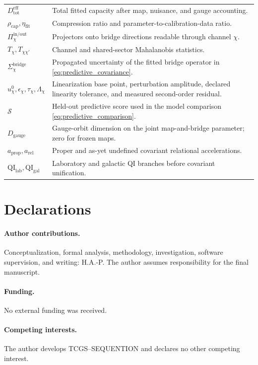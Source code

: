 \documentclass[11pt]{article}
\begin{document}
\begin{tabularx}{\textwidth}{>{\raggedright\arraybackslash}p{}X}
\(D_{\mathrm{tot}}^{\mathrm{eff}}\) & Total fitted capacity after map, nuisance, and gauge accounting. \\
\(\rho_{\mathrm{cap}},\eta_{\mathrm{fit}}\) & Compression ratio and parameter-to-calibration-data ratio. \\
\(\Pi_{\chi}^{\mathrm{in/out}}\) & Projectors onto bridge directions readable through channel \(\chi\). \\
\(T_{\chi},T_{\chi\chi'}\) & Channel and shared-sector Mahalanobis statistics. \\
\(\Sigma_{\chi}^{\mathrm{bridge}}\) & Propagated uncertainty of the fitted bridge operator in \cref{eq:predictive_covariance}. \\
\(u_{\chi}^{0},\epsilon_{\chi},\tau_{\chi},\Lambda_{\chi}\) & Linearization base point, perturbation amplitude, declared linearity tolerance, and measured second-order residual. \\
\(\mathcal S\) & Held-out predictive score used in the model comparison \cref{eq:predictive_comparison}. \\
\(D_{\mathrm{gauge}}\) & Gauge-orbit dimension on the joint map-and-bridge parameter; zero for frozen maps. \\
\(a_{\mathrm{prop}},a_{\mathrm{rel}}\) & Proper and as-yet undefined covariant relational accelerations. \\
\(\mathrm{QI}_{\mathrm{lab}},\mathrm{QI}_{\mathrm{gal}}\) & Laboratory and galactic QI branches before covariant unification. \\
\bottomrule
\end{tabularx}

\section*{Declarations}

\paragraph{Author contributions.}
Conceptualization, formal analysis, methodology, investigation, software supervision, and writing: H.A.-P. The author assumes responsibility for the final manuscript.

\paragraph{Funding.}
No external funding was received.

\paragraph{Competing interests.}
The author develops TCGS--SEQUENTION and declares no other competing interest.
\end{document}
